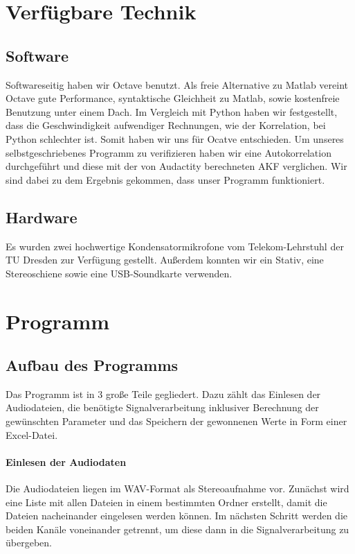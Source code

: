 \section{Verfügbare Technik}
\subsection{Software}
Softwareseitig haben wir Octave benutzt. Als freie Alternative zu Matlab vereint Octave gute Performance, syntaktische Gleichheit zu Matlab, sowie kostenfreie Benutzung unter einem Dach. Im Vergleich mit Python haben wir festgestellt, dass die Geschwindigkeit aufwendiger Rechnungen, wie der Korrelation, bei Python schlechter ist. Somit haben wir uns für Ocatve entschieden. Um unseres selbstgeschriebenes Programm zu verifizieren haben wir eine Autokorrelation durchgeführt und diese mit der von Audactity berechneten AKF verglichen. Wir sind dabei zu dem Ergebnis gekommen, dass unser Programm funktioniert.
\subsection{Hardware}
Es wurden zwei hochwertige Kondensatormikrofone vom Telekom-Lehrstuhl der TU Dresden zur Verfügung gestellt. Außerdem konnten wir ein Stativ, eine Stereoschiene sowie eine USB-Soundkarte verwenden.
\section{Programm}
\subsection{Aufbau des Programms}
Das Programm ist in 3 große Teile gegliedert. Dazu zählt das Einlesen der Audiodateien, die benötigte Signalverarbeitung inklusiver Berechnung der gewünschten Parameter und das Speichern der gewonnenen Werte in Form einer Excel-Datei.
\paragraph{Einlesen der Audiodaten}
Die Audiodateien liegen im WAV-Format als Stereoaufnahme vor. Zunächst wird eine Liste mit allen Dateien in einem bestimmten Ordner erstellt, damit die Dateien nacheinander eingelesen werden können. Im nächsten Schritt werden die beiden Kanäle voneinander getrennt, um diese dann in die Signalverarbeitung zu übergeben.
